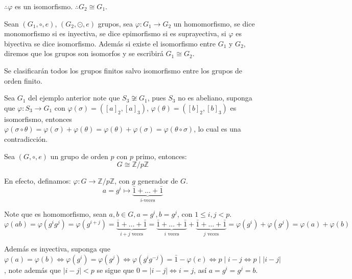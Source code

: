$\therefore \varphi$ es un isomorfismo.
$\therefore G_2 \cong G_1$.

\begin{defi}
	Sean $(G_1, \circ, e)$, $(G_2, \odot, e)$ grupos, sea $\varphi: G_1 \to G_2$ un homomorfismo, se dice monomorfismo si es inyectiva, se dice epimorfismo si es suprayectiva, si $\varphi$ es biyectiva se dice isomorfismo. Además si existe el isomorfismo entre $G_1$ y $G_2$, diremos que los grupos son isomorfos y se escribirá $G_1 \cong G_2$.

	Se clasificarán todos los grupos finitos salvo isomorfismo entre los grupos de orden finito.
\end{defi}

\begin{eje}
	Sea $G_1$ del ejemplo anterior note que $S_3 \not\cong G_1$, pues $S_3$ no es abeliano, suponga que $\varphi: S_3 \to G_1$ con $\varphi(\sigma) = ([a]_2, [a]_3)$, $\varphi(\theta) = ([b]_2, [b]_3)$ es isomorfismo, entonces $\varphi(\sigma \circ \theta) = \varphi(\sigma) + \varphi(\theta) = \varphi(\theta) + \varphi(\sigma) = \varphi(\theta \circ \sigma)$, lo cual es una contradicción.
\end{eje}

\begin{eje}
	\label{eje:grupo_ciclico_de_orden_primo}
	Sea $(G, \circ, e)$ un grupo de orden $p$ con $p$ primo, entonces:
	\begin{equation*}
		G \cong \mathbb{Z}/p\mathbb{Z}
	\end{equation*}
\end{eje}

En efecto, definamos: $\varphi: G \to \mathbb{Z}/p\mathbb{Z}$, con $g$ generador de $G$.
\begin{equation*}
	a = g^i \mapsto \underbrace{\bar{1} + \dots + \bar{1}}_{i\text{-veces}}
\end{equation*}

Note que es homomorfismo, sean $a, b \in G, a=g^i, b=g^j$, con $1 \le i, j < p$.
\begin{equation*}
	\varphi(ab) = \varphi(g^i g^j) = \varphi(g^{i+j}) = \underbrace{\bar{1} + \dots + \bar{1}}_{i+j \text{ veces}} = \underbrace{\bar{1} + \dots + \bar{1}}_{i \text{ veces}} + \underbrace{\bar{1} + \dots + \bar{1}}_{j \text{ veces}} = \varphi(g^i) + \varphi(g^j) = \varphi(a) + \varphi(b)
\end{equation*}

Además es inyectiva, suponga que $\varphi(a) = \varphi(b) \iff \varphi(g^i) = \varphi(g^j) \iff \varphi(g^i g^{-j}) = \bar{1} - \varphi(e) \iff p \mid i-j \iff p \mid |i-j|$, note además que $|i-j| < p$ se sigue que $0 = |i-j| \iff i=j$, así $a = g^i = g^j = b$.


